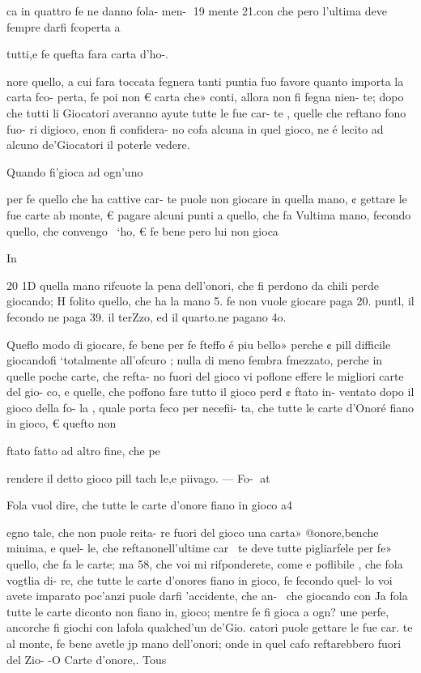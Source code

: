 {{{{{{ca in quattro fe ne danno fola-
 men-
19
mente 21.con che pero l’ultima
deve fempre darfi fcoperta a

tutti,e fe quefta fara carta d’ho-.

nore quello, a cui fara toccata
fegnera tanti puntia fuo favore
quanto importa la carta fco-
perta, fe poi non € carta che»
conti, allora non fi fegna nien-
te; dopo che tutti li Giocatori
averanno ayute tutte le fue car-
te , quelle che reftano fono fuo-
ri digioco, enon fi confidera-
no cofa alcuna in quel gioco, ne
é lecito ad alcuno de’Giocatori
il poterle vedere.

Quando fi'gioca ad ogn’uno

per fe quello che ha cattive car-
te puole non giocare in quella
mano, ¢ gettare le fue carte ab
monte, € pagare alcuni punti
a quello, che fa Vultima mano,
fecondo quello, che convengo~
‘ho, € fe bene pero lui non gioca

In
 

 

20
1D quella mano rifcuote la pena
dell’onori, che fi perdono da
chili perde giocando; H folito
quello, che ha la mano 5. fe non
vuole giocare paga 20. puntl, il
fecondo ne paga 39. il terZzo, ed
il quarto.ne pagano 4o.

Queflo modo di giocare, fe
bene per fe fteffo é piu bello»
perche ¢ pill difficile giocandofi
‘totalmente all’ofcuro ; nulla di
meno fembra fmezzato, perche
in quelle poche carte, che refta-
no fuori del gioco vi poflone
effere le migliori carte del gio-
co, e quelle, che poffono fare
tutto il gioco perd ¢ ftato in-
ventato dopo il gioco della fo-
la , quale porta feco per necefii-
ta, che tutte le carte d’Onoré
fiano in gioco, € quefto non

ftato fatto ad altro fine, che pe

rendere il detto gioco pill tach
le,e piivago. — Fo-
at

Fola vuol dire, che tutte le
carte d’onore fiano in gioco a4
{egno tale, che non puole reita-
re fuori del gioco una carta»
@onore,benche minima, e quel-
le, che reftanonell’ultime car~
te deve tutte pigliarfele per fe»
quello, che fa le carte; ma 58,
che voi mi rifponderete, come
e poflibile , che fola vogtlia di-
re, che tutte le carte d’onores
fiano in gioco, fe fecondo quel-
lo voi avete imparato poc’anzi
puole darfi ’accidente, che an-~
che giocando con Ja fola tutte
le carte diconto non fiano in,
gioco; mentre fe fi gioca a ogn?
une perfe, ancorche fi giochi
con lafola qualched’un de’Gio.
catori puole gettare le fue car.
te al monte, fe bene avetle jp
mano dell’onori; onde in quel
cafo reftarebbero fuori del Zio-
-O Carte d’onore,. Tous

}}}}}}}
